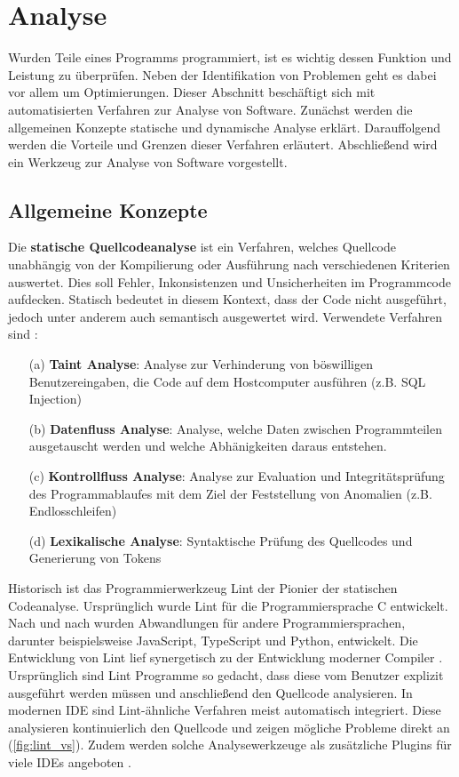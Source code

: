 \section{Analyse}
\label{sec:codeanalyse}
Wurden Teile eines Programms programmiert, ist es wichtig dessen Funktion und Leistung zu überprüfen. Neben der Identifikation von Problemen geht es dabei vor allem um Optimierungen. Dieser Abschnitt beschäftigt sich mit automatisierten Verfahren zur Analyse von Software. Zunächst werden die allgemeinen Konzepte statische und dynamische Analyse erklärt. Darauffolgend werden die Vorteile und Grenzen dieser Verfahren erläutert. Abschließend wird ein Werkzeug zur Analyse von Software vorgestellt. 

\subsection{Allgemeine Konzepte}
Die \textbf{statische Quellcodeanalyse} ist ein Verfahren, welches Quellcode unabhängig von der Kompilierung oder Ausführung nach verschiedenen Kriterien auswertet. Dies soll Fehler, Inkonsistenzen und Unsicherheiten im Programmcode aufdecken. Statisch bedeutet in diesem Kontext, dass der Code nicht ausgeführt, jedoch unter anderem auch semantisch ausgewertet wird. Verwendete Verfahren sind \cite[p.~12]{OwaspCodeReview2008}:
\begin{itemize}
	\item[(a)] \textbf {Taint Analyse}: Analyse zur Verhinderung von böswilligen Benutzereingaben, die Code auf dem Hostcomputer ausführen (z.B. SQL Injection)
	\item[(b)] \textbf {Datenfluss Analyse}: Analyse, welche Daten zwischen Programmteilen ausgetauscht werden und welche Abhänigkeiten daraus entstehen.
	\item[(c)] \textbf {Kontrollfluss Analyse}: Analyse zur Evaluation und Integritätsprüfung des Programmablaufes mit dem Ziel der Feststellung von Anomalien (z.B. Endlosschleifen)
	\item[(d)] \textbf {Lexikalische Analyse}: Syntaktische Prüfung des Quellcodes und Generierung von Tokens
\end{itemize}
Historisch ist das Programmierwerkzeug Lint der Pionier der statischen Codeanalyse. Ursprünglich wurde Lint für die Programmiersprache C entwickelt. Nach und nach wurden Abwandlungen für andere Programmiersprachen, darunter beispielsweise JavaScript, TypeScript und Python, entwickelt. Die Entwicklung von Lint lief synergetisch zu der Entwicklung moderner Compiler \cite[p.~2] {Darwin1988}. Ursprünglich sind Lint Programme so gedacht, dass diese vom Benutzer explizit ausgeführt werden müssen und anschließend den Quellcode analysieren.
In modernen IDE sind Lint-ähnliche Verfahren meist automatisch integriert. Diese analysieren kontinuierlich den Quellcode und zeigen mögliche Probleme direkt an (\autoref{fig:lint_vs}). 
Zudem werden solche Analysewerkzeuge als zusätzliche Plugins für viele IDEs angeboten \cite{Darwin1988}\cite{wiki:Lint_Programmierwerkzeug}.

